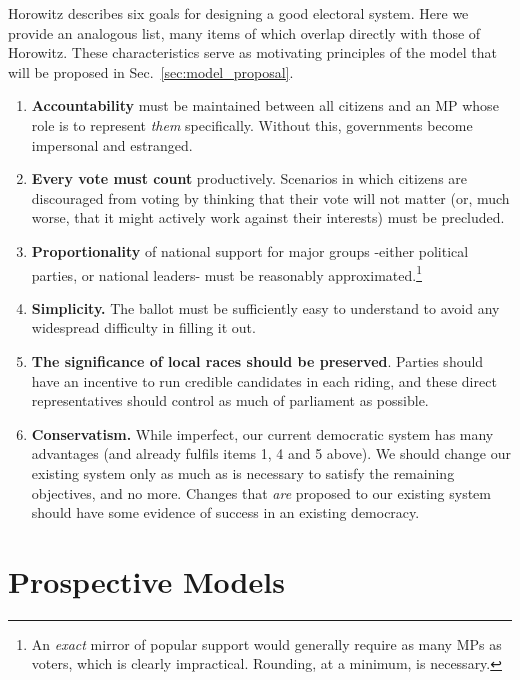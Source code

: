 Horowitz describes six goals for designing a good electoral system\cite{horowitz}. Here we provide an analogous list, many items of which overlap directly with those of Horowitz. These characteristics serve as motivating principles of the model that will be proposed in Sec.~\ref{sec:model_proposal}.
\begin{enumerate}
\item \textbf{Accountability} must be maintained between all citizens and an MP whose role is to represent \emph{them} specifically. Without this, governments become impersonal and estranged.
\item \textbf{Every vote must count} productively. Scenarios in which citizens are discouraged from voting by thinking that their vote will not matter (or, much worse, that it might actively work against their interests) must be precluded.
\item \textbf{Proportionality} of national support for major groups \--either political parties, or national leaders\-- must be reasonably approximated.\footnote{
An \emph{exact} mirror of popular support would generally require as many MPs as voters, which is clearly impractical. Rounding, at a minimum, is necessary.
}
\item   \textbf{Simplicity.} The ballot must be sufficiently easy to understand to avoid any widespread difficulty in filling it out.

\item  \textbf{The significance of local races should be preserved}. Parties should have an incentive to run credible candidates in each riding, and these direct representatives should control as much of parliament as possible.
\item \textbf{Conservatism.} While imperfect, our current democratic system has many advantages (and already fulfils items 1, 4 and 5 above). We should change our existing system only as much as is necessary to satisfy the remaining objectives, and no more. Changes that \emph{are} proposed to our existing system should have some evidence of success in an existing democracy.
\end{enumerate}


\section{Prospective Models}
\label{sec:alt_models}

